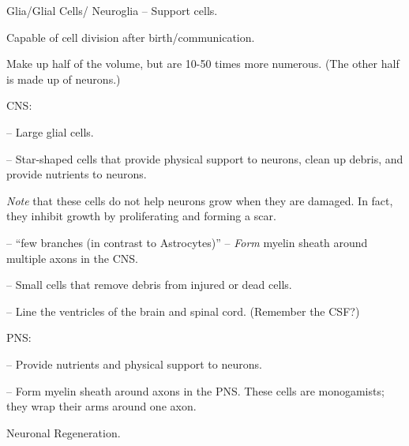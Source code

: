\begin{coloredlist}
    \item Glia/Glial Cells/ Neuroglia -- Support cells.
    \begin{coloredlist}
        \item Capable of cell division after birth/communication.
        \item Make up half of the volume, but are 10-50 times more numerous. (The other half is made up of neurons.)
        \item CNS:
        \begin{coloredlist}
            \item {} -- Large glial cells.
            \begin{coloredlist}
                \item {} -- Star-shaped cells that provide physical support to neurons, clean up debris, and provide nutrients to neurons.
                \begin{coloredlist}
                    \item \textit{Note} that these cells do not help neurons grow when they are damaged. In fact, they inhibit growth by proliferating and forming a scar.
                \end{coloredlist}
                \item {} -- ``few branches (in contrast to Astrocytes)'' -- \textit{Form} myelin sheath around multiple axons in the CNS. 
            \end{coloredlist}
            \item {} -- Small cells that remove debris from injured or dead cells.
            \item {} -- Line the ventricles of the brain and spinal cord. (Remember the CSF?)
        \end{coloredlist}
        \item PNS:
        \begin{coloredlist}
            \item {} -- Provide nutrients and physical support to neurons.
            \item {} -- Form myelin sheath around axons in the PNS. These cells are monogamists; they wrap their arms around one axon.
            \begin{coloredlist}
                \item Neuronal Regeneration. 
            \end{coloredlist}

\end{coloredlist}
\end{coloredlist}
\end{coloredlist}
